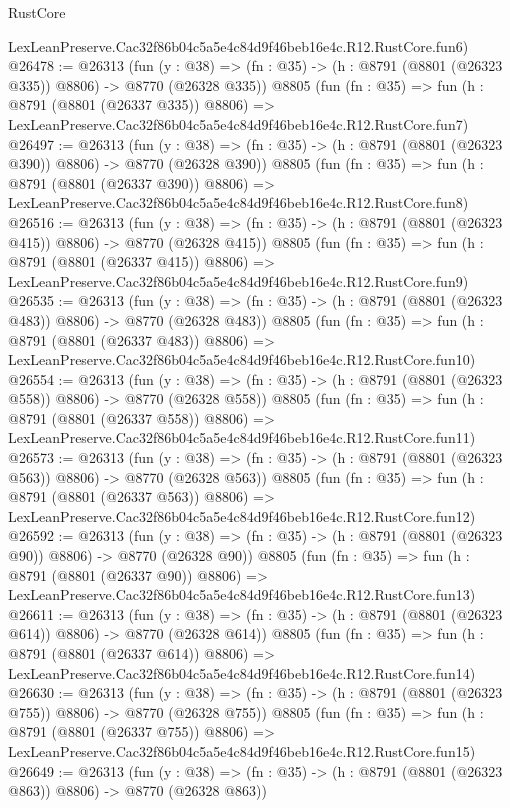 \begin{lexlean}{RustCore}
\begin{coremodule}
    LexLeanPreserve.Cac32f86b04c5a5e4c84d9f46beb16e4c.R12.RustCore.fun6)
@26478 := @26313
    (fun (y : @38) => (fn : @35) -> (h : @8791 (@8801 (@26323 @335)) @8806) -> @8770 (@26328 @335))
    @8805
    (fun (fn : @35) =>
    fun (h : @8791 (@8801 (@26337 @335)) @8806) =>
    LexLeanPreserve.Cac32f86b04c5a5e4c84d9f46beb16e4c.R12.RustCore.fun7)
@26497 := @26313
    (fun (y : @38) => (fn : @35) -> (h : @8791 (@8801 (@26323 @390)) @8806) -> @8770 (@26328 @390))
    @8805
    (fun (fn : @35) =>
    fun (h : @8791 (@8801 (@26337 @390)) @8806) =>
    LexLeanPreserve.Cac32f86b04c5a5e4c84d9f46beb16e4c.R12.RustCore.fun8)
@26516 := @26313
    (fun (y : @38) => (fn : @35) -> (h : @8791 (@8801 (@26323 @415)) @8806) -> @8770 (@26328 @415))
    @8805
    (fun (fn : @35) =>
    fun (h : @8791 (@8801 (@26337 @415)) @8806) =>
    LexLeanPreserve.Cac32f86b04c5a5e4c84d9f46beb16e4c.R12.RustCore.fun9)
@26535 := @26313
    (fun (y : @38) => (fn : @35) -> (h : @8791 (@8801 (@26323 @483)) @8806) -> @8770 (@26328 @483))
    @8805
    (fun (fn : @35) =>
    fun (h : @8791 (@8801 (@26337 @483)) @8806) =>
    LexLeanPreserve.Cac32f86b04c5a5e4c84d9f46beb16e4c.R12.RustCore.fun10)
@26554 := @26313
    (fun (y : @38) => (fn : @35) -> (h : @8791 (@8801 (@26323 @558)) @8806) -> @8770 (@26328 @558))
    @8805
    (fun (fn : @35) =>
    fun (h : @8791 (@8801 (@26337 @558)) @8806) =>
    LexLeanPreserve.Cac32f86b04c5a5e4c84d9f46beb16e4c.R12.RustCore.fun11)
@26573 := @26313
    (fun (y : @38) => (fn : @35) -> (h : @8791 (@8801 (@26323 @563)) @8806) -> @8770 (@26328 @563))
    @8805
    (fun (fn : @35) =>
    fun (h : @8791 (@8801 (@26337 @563)) @8806) =>
    LexLeanPreserve.Cac32f86b04c5a5e4c84d9f46beb16e4c.R12.RustCore.fun12)
@26592 := @26313
    (fun (y : @38) => (fn : @35) -> (h : @8791 (@8801 (@26323 @90)) @8806) -> @8770 (@26328 @90))
    @8805
    (fun (fn : @35) =>
    fun (h : @8791 (@8801 (@26337 @90)) @8806) =>
    LexLeanPreserve.Cac32f86b04c5a5e4c84d9f46beb16e4c.R12.RustCore.fun13)
@26611 := @26313
    (fun (y : @38) => (fn : @35) -> (h : @8791 (@8801 (@26323 @614)) @8806) -> @8770 (@26328 @614))
    @8805
    (fun (fn : @35) =>
    fun (h : @8791 (@8801 (@26337 @614)) @8806) =>
    LexLeanPreserve.Cac32f86b04c5a5e4c84d9f46beb16e4c.R12.RustCore.fun14)
@26630 := @26313
    (fun (y : @38) => (fn : @35) -> (h : @8791 (@8801 (@26323 @755)) @8806) -> @8770 (@26328 @755))
    @8805
    (fun (fn : @35) =>
    fun (h : @8791 (@8801 (@26337 @755)) @8806) =>
    LexLeanPreserve.Cac32f86b04c5a5e4c84d9f46beb16e4c.R12.RustCore.fun15)
@26649 := @26313
    (fun (y : @38) => (fn : @35) -> (h : @8791 (@8801 (@26323 @863)) @8806) -> @8770 (@26328 @863))

\end{coremodule}
\end{lexlean}
